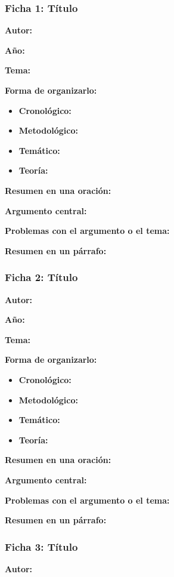 \documentclass{book}
\begin{document}
\subsubsection{Ficha 1: Título}
\textbf{Autor:}

\textbf{Año:}

\textbf{Tema:}

\textbf{Forma de organizarlo:}

\begin{itemize}
\setlength{\itemindent}{0.5in}
    \item \textbf{Cronológico:} 
    \item \textbf{Metodológico:} 
    \item \textbf{Temático:} 
    \item \textbf{Teoría:} 
\end{itemize}

\textbf{Resumen en una oración:}

\textbf{Argumento central:}

\textbf{Problemas con el argumento o el tema:}

\textbf{Resumen en un párrafo:}

\subsubsection{Ficha 2: Título}
\textbf{Autor:}

\textbf{Año:}

\textbf{Tema:}

\textbf{Forma de organizarlo:}

\begin{itemize}
\setlength{\itemindent}{0.5in}
    \item \textbf{Cronológico:} 
    \item \textbf{Metodológico:} 
    \item \textbf{Temático:} 
    \item \textbf{Teoría:} 
\end{itemize}

\textbf{Resumen en una oración:}

\textbf{Argumento central:}

\textbf{Problemas con el argumento o el tema:}

\textbf{Resumen en un párrafo:}

\subsubsection{Ficha 3: Título}
\textbf{Autor:}
\end{document}
